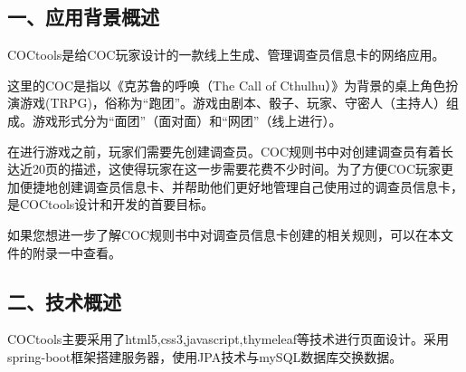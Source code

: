 \documentclass[a4paper,UTF8]{article}
\theoremstyle{definition}
\begin{document}
\begin{CJK}{UTF8}{gkai}
\begin{flushleft}
\begin{CJK*}{UTF8}{gbsn}
\section*{一、应用背景概述}
\end{CJK*}
\end{flushleft}
	\par COCtools是给COC玩家设计的一款线上生成、管理调查员信息卡的网络应用。
	\par 这里的COC是指以《克苏鲁的呼唤（The Call of Cthulhu）》为背景的桌上角色扮演游戏(TRPG)，俗称为“跑团”。游戏由剧本、骰子、玩家、守密人（主持人）组成。游戏形式分为“面团”（面对面）和“网团”（线上进行）。
	\par 在进行游戏之前，玩家们需要先创建调查员。COC规则书中对创建调查员有着长达近20页的描述，这使得玩家在这一步需要花费不少时间。为了方便COC玩家更加便捷地创建调查员信息卡、并帮助他们更好地管理自己使用过的调查员信息卡，是COCtools设计和开发的首要目标。
	\par 如果您想进一步了解COC规则书中对调查员信息卡创建的相关规则，可以在本文件的附录一中查看。\\

\begin{flushleft}
\begin{CJK*}{UTF8}{gbsn}
\section*{二、技术概述}
\end{CJK*}
\end{flushleft}
\par COCtools主要采用了html5,css3,javascript,thymeleaf等技术进行页面设计。采用spring-boot框架搭建服务器，使用JPA技术与mySQL数据库交换数据。

\begin{flushleft}
\begin{CJK*}{UTF8}{gbsn}

\end{CJK*}
\end{flushleft}
\end{CJK}
\end{document}
